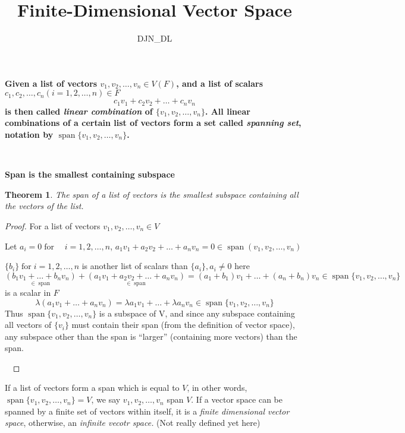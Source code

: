 \documentclass{amsart}
\newcommand{\tmdfn}[1]{\textbf{#1}}
\newcommand{\tmem}[1]{{\em #1\/}}
\newcommand{\tmop}[1]{\ensuremath{\operatorname{#1}}}
\newcommand{\tmstrong}[1]{\textbf{#1}}
\newtheorem{theorem}{Theorem}
\begin{document}
\title{Finite-Dimensional Vector Space}

\author{DJN\_DL}

{\maketitle}

{\tmdfn{Given a list of vectors $v_1, v_2, \ldots, v_n \in V (F)$, and a list
of scalars $c_1, c_2, \ldots, c_n (i = 1, 2, \ldots, n) \in F$
\[ c_1 v_1 + c_2 v_2 + \ldots + c_n v_n \]
is then called {\tmem{linear combination}} of $\{ v_1, v_2, \ldots, v_n \}$.
All linear combinations of a certain list of vectors form a set called
{\tmem{spanning set}}, notation by $\tmop{span} \{ v_1, v_2, \ldots, v_n
\}$.}}

\

{\tmstrong{Span is the smallest containing subspace}}

\begin{theorem}
  The span of a list of vectors is the smallest subspace containing all the
  vectors of the list.
\end{theorem}

\begin{proof}
  For a list of vectors $v_1, v_2, \ldots, v_n \in V$
  
  Let $a_i = 0 \tmop{for} \quad i = 1, 2, \ldots, n$, $a_1 v_1 + a_2 v_2 +
  \ldots + a_n v_n = 0 \in \tmop{span} (v_1, v_2, \ldots, v_n)$
  
  $\{ b_i \} \tmop{for} i = 1, 2, \ldots, n$ is another list of scalars than
  $\{ a_i \}, a_i \neq 0$ here
  \[ \underset{\in \tmop{span}}{(b_1 v_1 + \ldots + b_n v_n)} + \underset{\in
     \tmop{span}}{(a_1 v_1 + a_2 v_2 + \ldots + a_n v_n)} = (a_1 + b_1) v_1 +
     \ldots + (a_n + b_n) v_n \in \tmop{span} \{ v_1, v_2, \ldots, v_n \} \]
  \qquad{\tmem{$\lambda$}} is a scalar in $F$
  \[ \lambda (a_1 v_1 + \ldots + a_n v_n) = \lambda a_1 v_1 + \ldots + \lambda
     a_n v_n \in \tmop{span} \{ v_1, v_2, \ldots, v_n \} \]
  Thus $\tmop{span} \{ v_1, v_2, \ldots, v_n \}$ is a subspace of V, and since
  any subspace containing all vectors of $\{ v_i \}$ must contain their span
  (from the definition of vector space), any subspace other than the span is
  ``larger'' (containing more vectors) than the span.
  
  \ 
\end{proof}

If a list of vectors form a span which is equal to $V$, in other words,
$\tmop{span} \{ v_1, v_2, \ldots, v_n \} = V$, we say $v_1, v_2, \ldots, v_n$
span $V$. If a vector space can be spanned by a finite set of vectors within
itself, it is a {\tmem{finite dimensional vector space}}, otherwise, an
{\tmem{infinite vecotr space.}} (Not really defined yet here)
\end{document}
